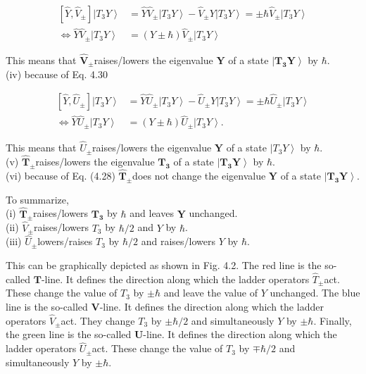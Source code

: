 \documentclass[10pt, letterpaper]{article}
\begin{document}
$$
\begin{aligned}
{\left[\hat{Y}, \hat{V}_{ \pm}\right]\left|T_{3} Y\right\rangle } & =\hat{Y} \hat{V}_{ \pm}\left|T_{3} Y\right\rangle-\hat{V}_{ \pm} Y\left|T_{3} Y\right\rangle= \pm \hbar \hat{V}_{ \pm}\left|T_{3} Y\right\rangle \\
\Longleftrightarrow \hat{Y} \hat{V}_{ \pm}\left|T_{3} Y\right\rangle & =(Y \pm \hbar) \hat{V}_{ \pm}\left|T_{3} Y\right\rangle
\end{aligned}
$$

This means that $\hat{\boldsymbol{V}}_{ \pm}$raises/lowers the eigenvalue $\boldsymbol{Y}$ of a state $\left|\boldsymbol{T}_{\mathbf{3}} \boldsymbol{Y}\right\rangle$ by $\hbar$.\\
(iv) because of Eq. 4.30

$$
\begin{aligned}
{\left[\hat{Y}, \hat{U}_{ \pm}\right]\left|T_{3} Y\right\rangle } & =\hat{Y} \hat{U}_{ \pm}\left|T_{3} Y\right\rangle-\hat{U}_{ \pm} Y\left|T_{3} Y\right\rangle= \pm \hbar \hat{U}_{ \pm}\left|T_{3} Y\right\rangle \\
\Longleftrightarrow \hat{Y} \hat{U}_{ \pm}\left|T_{3} Y\right\rangle & =(Y \pm \hbar) \hat{U}_{ \pm}\left|T_{3} Y\right\rangle .
\end{aligned}
$$

This means that $\hat{U}_{ \pm}$raises/lowers the eigenvalue $\boldsymbol{Y}$ of a state $\left|T_{3} Y\right\rangle$ by $\hbar$.\\
(v) $\hat{\boldsymbol{T}}_{ \pm}$raises/lowers the eigenvalue $\boldsymbol{T}_{\mathbf{3}}$ of a state $\left|\boldsymbol{T}_{\mathbf{3}} \boldsymbol{Y}\right\rangle$ by $\hbar$.\\
(vi) because of Eq. (4.28) $\hat{\boldsymbol{T}}_{ \pm}$does not change the eigenvalue $\boldsymbol{Y}$ of a state $\left|\boldsymbol{T}_{\mathbf{3}} \boldsymbol{Y}\right\rangle$.

To summarize,\\
(i) $\hat{\boldsymbol{T}}_{ \pm}$raises/lowers $\boldsymbol{T}_{\mathbf{3}}$ by $\hbar$ and leaves $\boldsymbol{Y}$ unchanged.\\
(ii) $\hat{V}_{ \pm}$raises/lowers $T_{3}$ by $\hbar / 2$ and $Y$ by $\hbar$.\\
(iii) $\hat{U}_{ \pm}$lowers/raises $T_{3}$ by $\hbar / 2$ and raises/lowers $Y$ by $\hbar$.

This can be graphically depicted as shown in Fig. 4.2. The red line is the so-called $\boldsymbol{T}$-line. It defines the direction along which the ladder operators $\hat{T}_{ \pm}$act. These change the value of $T_{3}$ by $\pm \hbar$ and leave the value of $Y$ unchanged. The blue line is the so-called $\boldsymbol{V}$-line. It defines the direction along which the ladder operators $\hat{V}_{ \pm}$act. They change $T_{3}$ by $\pm \hbar / 2$ and simultaneously $Y$ by $\pm \hbar$. Finally, the green line is the so-called $\boldsymbol{U}$-line. It defines the direction along which the ladder operators $\hat{U}_{ \pm}$act. These change the value of $T_{3}$ by $\mp \hbar / 2$ and simultaneously $Y$ by $\pm \hbar$.
\end{document}
